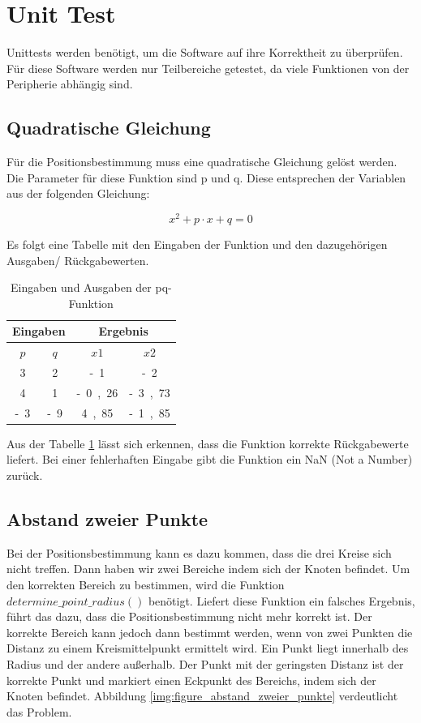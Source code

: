 \newpage
\section{Unit Test}
Unittests werden benötigt, um die Software auf ihre Korrektheit zu überprüfen. Für diese Software werden nur Teilbereiche getestet, da viele Funktionen von der Peripherie abhängig sind.

\subsection{Quadratische Gleichung}
Für die Positionsbestimmung muss eine quadratische Gleichung gelöst werden. Die Parameter für diese Funktion sind \si{p} und \si{q}. Diese entsprechen der Variablen aus der folgenden Gleichung:

\begin{equation}
\label{eq:unit_test_pq_formel}
x^{2} + p \cdot x + q = 0
\end{equation}

Es folgt eine Tabelle mit den Eingaben der Funktion und den dazugehörigen Ausgaben/ Rückgabewerten. 

\begin{table}[H]
\centering
\caption{Eingaben und Ausgaben der pq-Funktion}
\label{table:pq_funktion}
\begin{tabular}{|c|c|c|c|}
\hline
\multicolumn{2}{|c|}{\textbf{Eingaben}} & \multicolumn{2}{c|}{\textbf{Ergebnis}} \\ \hline
\textbf{$p$}         & \textbf{$q$}         & \textbf{$x1$}        & \textbf{$x2$}       \\ \hline
\si{3}	 & 	\si{2}	 & 	\si{-1}	 & 	\si{-2}	 \\ \hline
\si{4}	 & 	\si{1}	 & 	\si{-0,26}	 & 	\si{-3,73}	 \\ \hline
\si{-3}	 & 	\si{-9}	 & 	\si{4,85}	 & 	\si{-1,85}	 \\ \hline
\end{tabular}
\end{table}


Aus der Tabelle \ref{table:pq_funktion} lässt sich erkennen, dass die Funktion korrekte Rückgabewerte liefert. Bei einer fehlerhaften Eingabe gibt die Funktion ein \si{NaN} (Not a Number) zurück.


\subsection{Abstand zweier Punkte}
Bei der Positionsbestimmung kann es dazu kommen, dass die drei Kreise sich nicht treffen. Dann haben wir zwei Bereiche indem sich der Knoten befindet. Um den korrekten Bereich zu bestimmen, wird die Funktion $determine\_point\_radius()$ benötigt. Liefert diese Funktion ein falsches Ergebnis, führt das dazu, dass die Positionsbestimmung nicht mehr korrekt ist. Der korrekte Bereich kann jedoch dann bestimmt werden, wenn von zwei Punkten die Distanz zu einem Kreismittelpunkt ermittelt wird. Ein Punkt liegt innerhalb des Radius und der andere außerhalb. Der Punkt mit der geringsten Distanz ist der korrekte Punkt und markiert einen Eckpunkt des Bereichs, indem sich der Knoten befindet. Abbildung \ref{img:figure_abstand_zweier_punkte} verdeutlicht das Problem.

